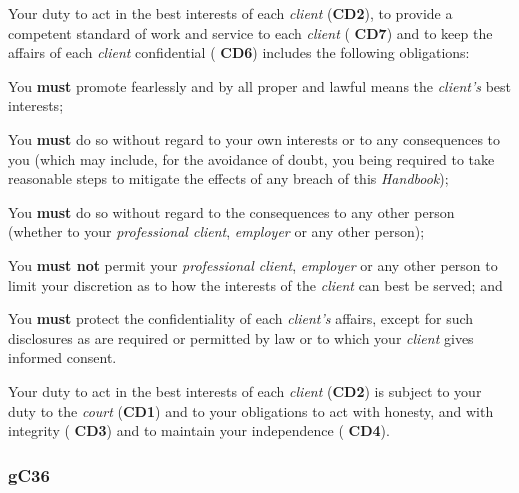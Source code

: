 Your duty to act in the best interests of each \emph{client} (\textcolor{mygold}{\textbf{CD2}}), to
provide a competent standard of work and service to each \emph{client}
( \textbf{\textcolor{mygold}{CD7}}) and to keep the affairs of each \emph{client} confidential ( \textbf{\textcolor{mygold}{CD6}})
includes the following obligations:
\begin{numlist}\item You \textcolor{myred}{\textbf{must}} promote fearlessly and by all proper and lawful means the
\emph{client's} best interests;
\item You \textcolor{myred}{\textbf{must}} do so without regard to your own interests or to any
consequences to you (which may include, for the avoidance of doubt, you
being required to take reasonable steps to mitigate the effects of any
breach of this \emph{Handbook});
\item You \textcolor{myred}{\textbf{must}} do so without regard to the consequences to any other person
(whether to your \emph{professional client}, \emph{employer} or any
other person);
\item You \textcolor{myred}{\textbf{must not}} permit your \emph{professional client}, \emph{employer}
or any other person to limit your discretion as to how the interests of
the \emph{client} can best be served; and
\item You \textcolor{myred}{\textbf{must}} protect the confidentiality of each \emph{client's} affairs,
except for such disclosures as are required or permitted by law or to
which your \emph{client} gives informed consent.
\end{numlist}


Your duty to act in the best interests of each \emph{client} (\textcolor{mygold}{\textbf{CD2}}) is
subject to your duty to the \emph{court} (\textcolor{mygold}{\textbf{CD1}}) and to your obligations
to act with honesty, and with integrity ( \textbf{\textcolor{mygold}{CD3}}) and to maintain your
independence ( \textbf{\textcolor{mygold}{CD4}}).




\subsubsection{\color{darkgrey}gC36}

